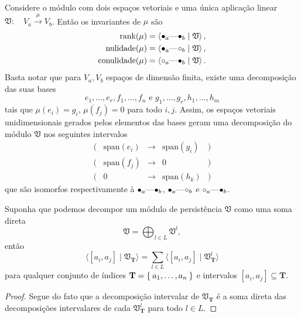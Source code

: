 \begin{ex}
    Considere o módulo com dois espaços vetoriais e uma única aplicação linear $\mathfrak{V} : \quad 
    V_a \xrightarrow{\mu} V_b$. Então os invariantes de $\mu$ são
    \begin{align*}
        \text{rank}(\mu)       & = \innerproduct{\qon{a} \qem \qon{b} \mid \mathfrak{V}}, \\
        \text{nulidade}(\mu)   & = \innerproduct{\qon{a} \qem \qoff{b} \mid \mathfrak{V}}, \\
        \text{conulidade}(\mu) & = \innerproduct{\qoff{a} \qem \qon{b} \mid \mathfrak{V}}.
    \end{align*}
    Basta notar que para $V_a, V_b$ espaços de dimensão finita, existe uma decomposição das suas bases 
    \begin{equation*}
        e_1, \dots, e_r, f_1, \dots, f_n \text{   e   } g_1, \dots, g_r, h_1, \dots, h_m
    \end{equation*}
    tais que $\mu(e_i) = g_i$, $\mu(f_j) = 0$ para todo $i,j$. Assim, os espaços vetoriais unidimensionais
    gerados pelos elementos das bases geram uma decomposição do módulo $\mathfrak{V}$ nos seguintes intervalos
    \[\begin{array}{ccccc}
        (&\text{span}(e_i) & \rightarrow &\text{span}(g_i)&) \\
        (&\text{span}(f_j) & \rightarrow &0               &) \\
        (& 0               & \rightarrow &\text{span}(h_k)&)
    \end{array}\]
    que são isomorfos respectivamente à $\qon{a} \qem \qon{b}$, $\qon{a} \qem \qoff{b}$ e 
    $\qoff{a} \qem \qon{b}$. 
\end{ex}

\begin{propo}\label{teo:direct_sum}
    Suponha que podemos decompor um módulo de persistência $\mathfrak{V}$ como uma soma direta
    \begin{equation*}
        \mathfrak{V} = \bigoplus_{l\in L} \mathfrak{V}^l,
    \end{equation*}
    então 
    \begin{equation*}
        \langle [a_i, a_j] \mid \mathfrak{V}_{\mathbf{T}} \rangle = \sum_{l\in L} \langle [a_i, a_j] 
        \mid \mathfrak{V}_{\mathbf{T}}^l \rangle
    \end{equation*}
    para qualquer conjunto de índices $\mathbf{T} = \Set{a_1, \dots, a_n}$ e intervalos $[a_i, a_j] \subseteq \mathbf{T}$.
\end{propo}
\begin{proof}
    Segue do fato que a decomposição intervalar de $\mathfrak{V}_{\mathbf{T}}$ é a soma direta das decomposições intervalares 
    de cada $\mathfrak{V}^l_{\mathbf{T}}$ para todo $l \in L$. 
\end{proof}

